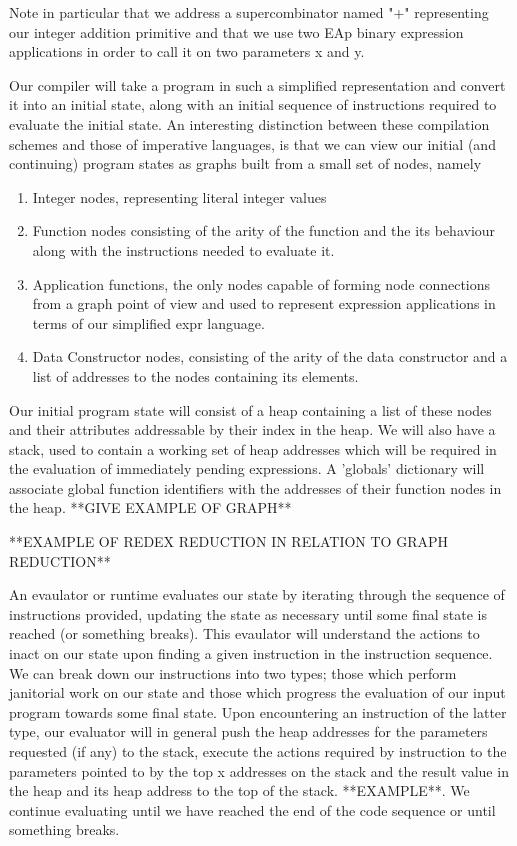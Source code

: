 \documentclass[11pt]{article}
\begin{document}
Note in particular that we address a supercombinator named "+" 
representing our integer addition primitive and that we use two EAp 
binary expression applications in order to call it on two parameters x and y.

Our compiler will take a program in such a simplified representation
and convert it into an initial state, along with an initial sequence of
instructions required to evaluate the initial state. An interesting 
distinction between these compilation schemes and those of imperative languages, 
is that we can view our initial (and continuing) program states as graphs built
from a small set of nodes, namely

\begin{enumerate}
	\item Integer nodes, representing literal integer values
	\item Function nodes consisting of the arity of the function and the
		  its behaviour along with the instructions needed to evaluate it.
	\item Application functions, the only nodes capable of forming 
		  node connections from a graph point of view and used to represent
		  expression applications in terms of our simplified expr language.
	\item Data Constructor nodes, consisting of the arity of the data
		  constructor and a list of addresses to the nodes containing its
		  elements.
\end{enumerate}

Our initial program state will consist of a heap containing a list of these
nodes and their attributes addressable by their index in the heap. We will
also have a stack, used to contain a working set of heap addresses which 
will be required in the evaluation of immediately pending expressions. A 
'globals' dictionary will associate global function identifiers with the
addresses of their function nodes in the heap. **GIVE EXAMPLE OF GRAPH**

**EXAMPLE OF REDEX REDUCTION IN RELATION TO GRAPH REDUCTION**

An evaulator or runtime evaluates our state by iterating through the 
sequence of instructions provided, updating the state as necessary until
some final state is reached (or something breaks). This evaulator will 
understand the actions to inact on our state upon finding a given instruction
in the instruction sequence. We can break down our instructions into two
types; those which perform janitorial work on our state and those which
progress the evaluation of our input program towards some final state. 
Upon encountering an instruction of the latter type, our evaluator will 
in general push the heap addresses for the parameters requested (if any) 
to the stack, execute the actions required by instruction to the parameters
pointed to by the top x addresses on the stack and the result value in 
the heap and its heap address to the top of the stack. **EXAMPLE**. We
continue evaluating until we have reached the end of the code sequence
or until something breaks. 
\end{document}
